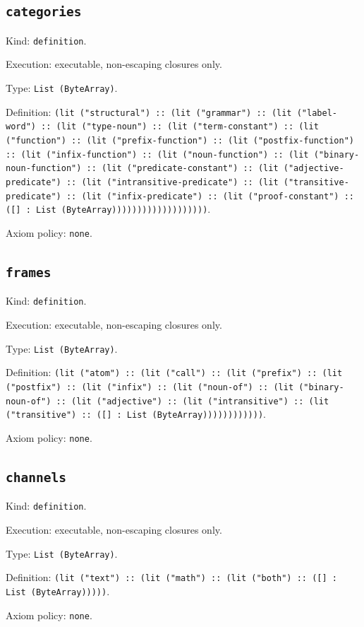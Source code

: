 \documentclass[11pt]{article}
\begin{document}
\subsection*{\texttt{categories}}
\noindent Kind: \texttt{definition}.\par
\noindent Execution: executable, non-escaping closures only.\par
\noindent Type: \texttt{List (ByteArray)}.\par
\noindent Definition: \texttt{(lit ("structural") :: (lit ("grammar") :: (lit ("label-word") :: (lit ("type-noun") :: (lit ("term-constant") :: (lit ("function") :: (lit ("prefix-function") :: (lit ("postfix-function") :: (lit ("infix-function") :: (lit ("noun-function") :: (lit ("binary-noun-function") :: (lit ("predicate-constant") :: (lit ("adjective-predicate") :: (lit ("intransitive-predicate") :: (lit ("transitive-predicate") :: (lit ("infix-predicate") :: (lit ("proof-constant") :: ([] : List (ByteArray)))))))))))))))))))}.\par
\noindent Axiom policy: \texttt{none}.\par
\subsection*{\texttt{frames}}
\noindent Kind: \texttt{definition}.\par
\noindent Execution: executable, non-escaping closures only.\par
\noindent Type: \texttt{List (ByteArray)}.\par
\noindent Definition: \texttt{(lit ("atom") :: (lit ("call") :: (lit ("prefix") :: (lit ("postfix") :: (lit ("infix") :: (lit ("noun-of") :: (lit ("binary-noun-of") :: (lit ("adjective") :: (lit ("intransitive") :: (lit ("transitive") :: ([] : List (ByteArray))))))))))))}.\par
\noindent Axiom policy: \texttt{none}.\par
\subsection*{\texttt{channels}}
\noindent Kind: \texttt{definition}.\par
\noindent Execution: executable, non-escaping closures only.\par
\noindent Type: \texttt{List (ByteArray)}.\par
\noindent Definition: \texttt{(lit ("text") :: (lit ("math") :: (lit ("both") :: ([] : List (ByteArray)))))}.\par
\noindent Axiom policy: \texttt{none}.\par
\end{document}
